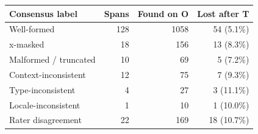 \begin{tabular}{lrrr}
\toprule
Consensus label & Spans & Found on O & Lost after T\\
\midrule
Well-formed & 128 & 1058 & 54 (5.1\%)\\
x-masked & 18 & 156 & 13 (8.3\%)\\
Malformed / truncated & 10 & 69 & 5 (7.2\%)\\
Context-inconsistent & 12 & 75 & 7 (9.3\%)\\
Type-inconsistent & 4 & 27 & 3 (11.1\%)\\
Locale-inconsistent & 1 & 10 & 1 (10.0\%)\\
Rater disagreement & 22 & 169 & 18 (10.7\%)\\
\bottomrule
\end{tabular}

